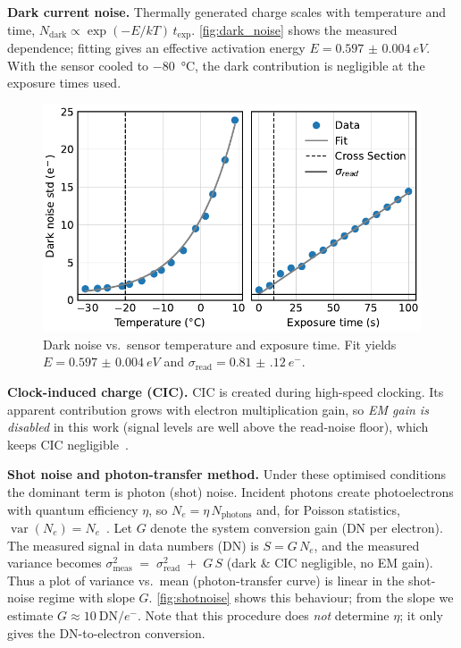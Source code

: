 \documentclass[
	parskip=half,
	a4paper,
]{scrarticle}
\begin{document}
\textbf{Dark current noise.}
Thermally generated charge scales with temperature and time,
\(N_\text{dark}\propto \exp(-E/kT)\,t_\text{exp}\).
\autoref{fig:dark_noise} shows the measured dependence; fitting gives an effective activation energy \(E=\SI{0.597(4)}{eV}\).
With the sensor cooled to \SI{-80}{\degreeCelsius}, the dark contribution is negligible at the exposure times used.

\begin{figure}
    \centering
    \includegraphics{../analysis/figures/dark_noise.pdf}
    \caption{Dark noise vs.\ sensor temperature and exposure time. Fit yields \(E=\SI{0.597(4)}{eV}\) and \(\sigma_{\text{read}}=\SI{0.81(12)}{e^{-}}\).}
    \label{fig:dark_noise}
\end{figure}

\textbf{Clock-induced charge (CIC).}
CIC is created during high-speed clocking.
Its apparent contribution grows with electron multiplication gain, so \emph{EM gain is disabled} in this work (signal levels are well above the read-noise floor), which keeps CIC negligible~\cite{andor_establishing_nodate}.

\textbf{Shot noise and photon-transfer method.}
Under these optimised conditions the dominant term is photon (shot) noise.
Incident photons create photoelectrons with quantum efficiency \(\eta\), so \(N_e=\eta\,N_{\text{photons}}\) and, for Poisson statistics, \(\operatorname{var}(N_e)=N_e\)~\cite{european_machine_vision_association_standard_2010}.
Let \(G\) denote the system conversion gain (DN per electron). The measured signal in data numbers (DN) is \(S = G\,N_e\), and the measured variance becomes \(\sigma^2_{\text{meas}} \;=\; \sigma_{\text{read}}^2 \;+\; G\,S\) (dark \& CIC negligible, no EM gain).
Thus a plot of variance vs.\ mean (photon-transfer curve) is linear in the shot-noise regime with slope \(G\).
\autoref{fig:shotnoise} shows this behaviour; from the slope we estimate \(G \approx 10~\text{DN}/e^{-}\).
Note that this procedure does \emph{not} determine \(\eta\); it only gives the DN-to-electron conversion.
\end{document}
